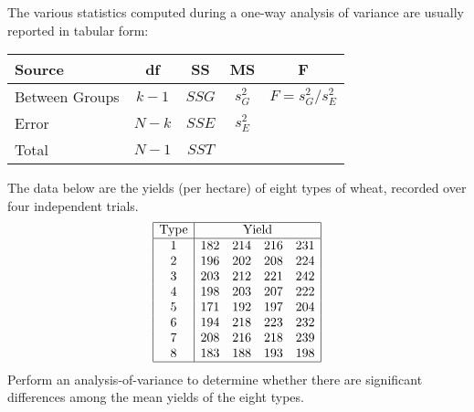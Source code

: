 The various statistics computed during a one-way analysis of variance are usually reported in tabular form:
\begin{center}
\begin{tabular}{|l|c|c|c|c|} \hline
Source 			& \qquad df\qquad\mbox{}& \qquad SS\qquad\mbox{}& \qquad MS\qquad\mbox{}& \qquad F\qquad\mbox{}	\\ \hline
Between Groups	& $k-1$					& $SSG$					& $s^2_G$				& $F = s^2_G/s^2_E$		\\ \hline
Error 			& $N-k$					& $SSE$					& $s^2_E$				&						\\ \hline
Total			& $N-1$					& $SST$					& 						& 						\\ \hline
\end{tabular}\par
\end{center}

\begin{example}
The data below are the yields (per hectare) of eight types of wheat, recorded over four independent trials. 
\[
\begin{array}{|c|cccc|}\hline
\text{Type}	& \multicolumn{4}{c|}{\text{Yield}} \\ \hline
1 &  182 & 214 & 216 & 231 \\
2 &  196 & 202 & 208 & 224 \\
3 &  203 & 212 & 221 & 242 \\
4 &  198 & 203 & 207 & 222 \\
5 &  171 & 192 & 197 & 204 \\
6 &  194 & 218 & 223 & 232 \\
7 &  208 & 216 & 218 & 239 \\
8 &  183 & 188 & 193 & 198 \\ \hline
\end{array}
\]
Perform an analysis-of-variance to determine whether there are significant differences among the mean yields of the eight types.
\end{example}

